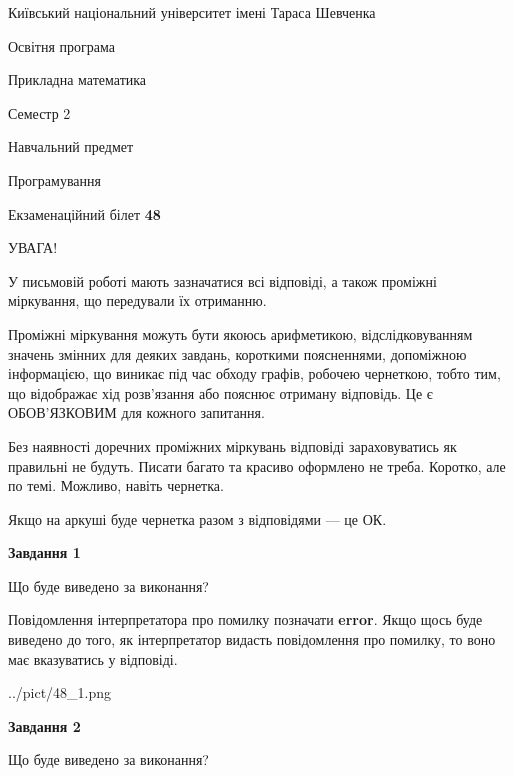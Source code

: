 \documentclass[12pt, ukrainian]{article}
\begin{document}
{{\begin {small}\par
{ \center  Київський національний університет імені Тараса Шевченка \par}
{\parbox {5 cm}{Освітня програма \hfill}{\parbox {7 cm}{Прикладна математика \hfill}}\parbox {6 cm}{\hfill Семестр 2}}\par
{\parbox {5 cm} {Навчальний предмет \hfill}\parbox {7 cm}{Програмування \hfill}\parbox {6cm}{\hfill}\par}\vspace{-7pt} \end{small}}{\center Екзаменаційний білет \No \textbf
{ 48 }\par}}
{
\begin {large}
УВАГА!

У письмовій роботі мають зазначатися всі відповіді, а також проміжні міркування, що передували їх отриманню.

Проміжні міркування можуть бути якоюсь арифметикою, відслідковуванням зна\-чень змінних для деяких завдань,
короткими поясненнями, допоміжною інформацією, що виникає під час обходу графів, робочею чернеткою,
тобто тим, що відображає хід розв’язання або пояснює отриману відповідь.
Це є ОБОВ’ЯЗКОВИМ для кожного запитання.

Без наявності доречних проміжних міркувань відповіді зараховуватись як правиль\-ні не будуть.
Писати багато та красиво оформлено не треба. Коротко, але по темі. Можли\-во, навіть чернетка.

Якщо на аркуші буде чернетка разом з відповідями --- це ОК.

\newpage

{\begin {center}\textbf{Завдання 1}\end {center}}\par
Що буде виведено за виконання?

Повідомлення інтерпретатора про помилку позначати \textbf{error}.
Якщо щось буде виведено до того, як інтерпретатор видасть повідомлення про помилку, 
то воно має вказуватись у відповіді. \par


\begin{center}
	{../pict/48_1.png}
\end{center}
\newpage

{\begin {center}\textbf{Завдання 2}\end {center}}\par
Що буде виведено за виконання?


\end{large}}
\end{document}
